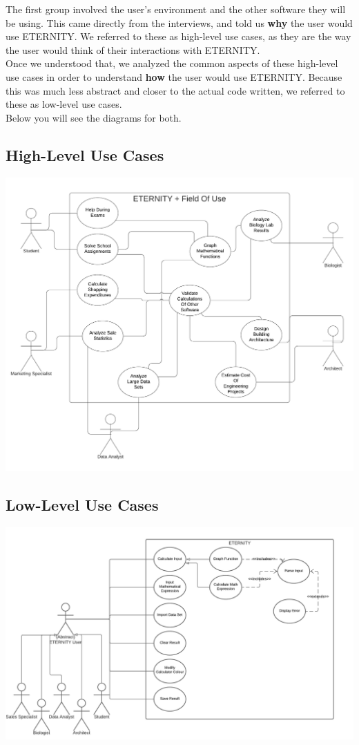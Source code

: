 \documentclass[11pt,onside]{report}
\begin{document}
The first group involved the user's environment and the other software they will be using. This came directly from the interviews, and told us \textbf{why} the user would use ETERNITY. We referred to these as high-level use cases, as they are the way the user would think of their interactions with ETERNITY. \\

Once we understood that, we analyzed the common aspects of these high-level use cases in order to understand \textbf{how} the user would use ETERNITY. Because this was much less abstract and closer to the actual code written, we referred to these as low-level use cases. \\

Below you will see the diagrams for both.

\subsection{High-Level Use Cases}
\begin{center}
    \includegraphics[scale=0.66]{images/high-level-use-case.png}
\end{center}

\subsection{Low-Level Use Cases}
\begin{center}
    \includegraphics[scale=0.6]{images/low-level-use-case.png}
\end{center}

 

\end{document}
